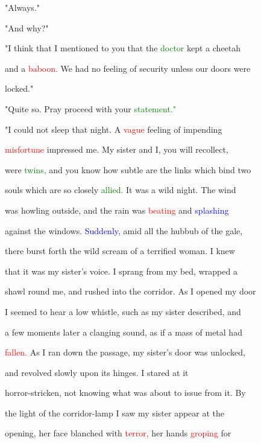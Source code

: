  "Always."



 "And why?"



 "I think that I mentioned to you that the \textcolor{green}{doctor} kept a cheetah

 and a \textcolor{red}{baboon.} We had no feeling of security unless our doors were

 locked."



 "Quite so. \textcolor{BurntOrange}{Pray} proceed with your \textcolor{green}{statement."}



 "I could not sleep that night. A \textcolor{red}{vague} feeling of impending

 \textcolor{red}{misfortune} impressed me. My sister and I, you will recollect,

 were \textcolor{green}{twins,} and you know how subtle are the links which bind two

 souls which are so closely \textcolor{green}{allied.} It was a \textcolor{BurntOrange}{wild} night. The wind

 was \textcolor{BurntOrange}{howling} outside, and the rain was \textcolor{red}{beating} and \textcolor{blue}{splashing}

 against the windows. \textcolor{blue}{Suddenly,} amid all the hubbub of the gale,

 there burst forth the \textcolor{BurntOrange}{wild} \textcolor{BurntOrange}{scream} of a terrified woman. I knew

 that it was my sister's voice. I sprang from my bed, wrapped a

 shawl round me, and rushed into the corridor. As I opened my door

 I seemed to hear a low whistle, such as my sister described, and

 a few moments later a clanging sound, as if a mass of metal had

 \textcolor{red}{fallen.} As I ran down the passage, my sister's door was unlocked,

 and revolved slowly upon its hinges. I \textcolor{BurntOrange}{stared} at it

 horror-stricken, not knowing what was about to issue from it. By

 the light of the corridor-lamp I saw my sister appear at the

 opening, her face blanched with \textcolor{red}{terror,} her hands \textcolor{red}{groping} for

